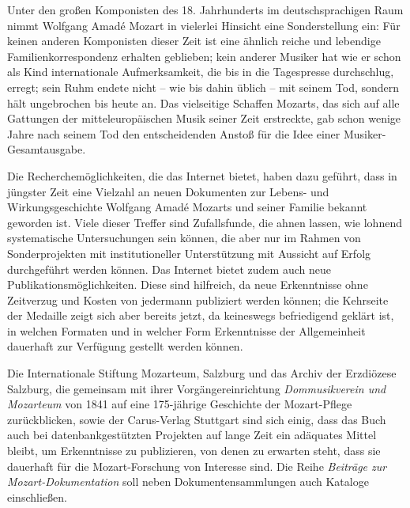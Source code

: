 \onecolumn
{}
Unter den großen Komponisten des 18. Jahrhunderts im deutschsprachigen Raum nimmt Wolfgang Amadé Mozart in vielerlei Hinsicht eine Sonderstellung ein: Für keinen anderen Komponisten dieser Zeit ist eine ähnlich reiche und lebendige Familienkorrespondenz erhalten geblieben; kein anderer Musiker hat wie er schon als Kind internationale Aufmerksamkeit, die bis in die Tagespresse durchschlug, erregt; sein Ruhm endete nicht – wie bis dahin üblich – mit seinem Tod, sondern hält ungebrochen bis heute an. Das vielseitige Schaffen Mozarts, das sich auf alle Gattungen der mitteleuropäischen Musik seiner Zeit erstreckte, gab schon wenige Jahre nach seinem Tod den entscheidenden Anstoß für die Idee einer Musiker-Gesamtausgabe.


Die Recherchemöglichkeiten, die das Internet bietet, haben dazu geführt, dass in jüngster Zeit eine Vielzahl an neuen Dokumenten zur Lebens- und Wirkungsgeschichte Wolfgang Amadé Mozarts und seiner Familie bekannt geworden ist. Viele dieser Treffer sind Zufallsfunde, die ahnen lassen, wie lohnend systematische Untersuchungen sein können, die aber nur im Rahmen von Sonderprojekten mit institutioneller Unterstützung mit Aussicht auf Erfolg durchgeführt werden können. Das Internet bietet zudem auch neue Publikationsmöglichkeiten. Diese sind hilfreich, da neue Erkenntnisse ohne Zeitverzug und Kosten von jedermann publiziert werden können; die Kehrseite der Medaille zeigt sich aber bereits jetzt, da keineswegs befriedigend geklärt ist, in welchen Formaten und in welcher Form Erkenntnisse der Allgemeinheit dauerhaft zur Verfügung gestellt werden können.

Die Internationale Stiftung Mozarteum, Salzburg und das Archiv der Erzdiözese Salzburg, die gemeinsam mit ihrer Vorgängereinrichtung \textit{Dommusikverein und Mozarteum} von 1841 auf eine 175-jährige Geschichte der Mozart-Pflege zurückblicken, sowie der Carus-Verlag Stuttgart sind sich einig, dass das Buch auch bei datenbankgestützten Projekten auf lange Zeit ein adäquates Mittel bleibt, um Erkenntnisse zu publizieren, von denen zu erwarten steht, dass sie dauerhaft für die Mozart-Forschung von Interesse sind. Die Reihe \textit{Beiträge zur Mozart-Dokumentation} soll neben Dokumentensammlungen auch Kataloge einschließen.

